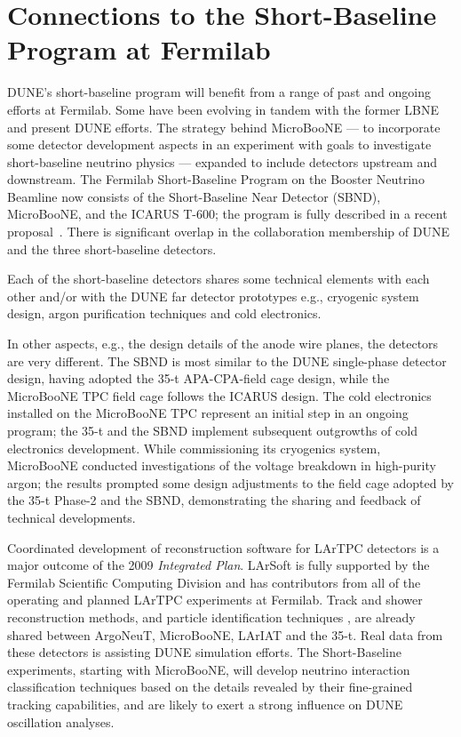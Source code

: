 \section{Connections to the Short-Baseline Program at Fermilab}
\label{sec:sbn_connect}

 
DUNE's short-baseline program will benefit from a range of past and ongoing efforts at Fermilab. Some have been evolving
in tandem with the former LBNE and present DUNE efforts. The strategy behind MicroBooNE --- to incorporate some detector development aspects in an experiment with goals to investigate short-baseline neutrino physics --- expanded to include detectors upstream and downstream.  The Fermilab Short-Baseline Program on the Booster Neutrino Beamline now consists of the Short-Baseline Near Detector (SBND), MicroBooNE, and the ICARUS T-600; the program is fully described in a recent proposal~\cite{Antonello:2015lea}.  There is significant overlap in the collaboration membership of DUNE and the three short-baseline detectors.
 
Each of the short-baseline detectors shares some technical elements with each other and/or with the DUNE far detector prototypes e.g.,   
 cryogenic system design,
 argon purification techniques and
 cold electronics.

In other aspects, e.g., the design details of the anode wire planes, %
the detectors are very different.  The SBND is most similar to the DUNE single-phase detector design, having adopted the 35-t APA-CPA-field cage design, while the MicroBooNE TPC field cage follows the ICARUS design.  The cold electronics installed on the MicroBooNE TPC represent an initial step in an ongoing program; the 35-t and the SBND 
implement subsequent outgrowths of
cold electronics development.  While commissioning its cryogenics system, MicroBooNE conducted investigations of the voltage breakdown in high-purity argon; the results prompted some design adjustments to the field cage adopted by the 35-t Phase-2 and the SBND, demonstrating the sharing and feedback of technical developments.  

Coordinated development of reconstruction software for LArTPC detectors is a major outcome of the 2009 \textit{Integrated Plan}.  LArSoft is fully supported by the Fermilab Scientific Computing Division and has contributors from all of the operating and planned LArTPC experiments at Fermilab.  Track and shower reconstruction methods, and particle identification techniques , are already shared between ArgoNeuT, MicroBooNE, LArIAT and the 35-t.  Real data from these detectors is assisting DUNE simulation efforts.  The Short-Baseline experiments, starting with MicroBooNE, will develop neutrino interaction classification techniques based on the details revealed by their fine-grained tracking capabilities, and are likely to exert a strong influence on DUNE oscillation analyses.



 